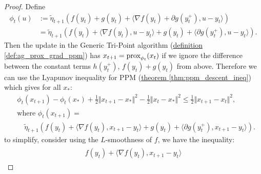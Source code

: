 \documentclass[12pt]{article}
\begin{document}
        \begin{proof}
            Define 
            \begin{align*}
                \phi_t(u) &:= 
                \tilde \eta_{t + 1} 
                \left(
                    f(y_t) + g(y_t) + \langle \nabla f(y_t) + \partial g(y_t^+), u - y_t\rangle
                \right)\\
                &= 
                \tilde \eta_{t + 1} \left(
                    f(y_t) + \langle \nabla f(y_t), u - y_t\rangle + 
                    g(y_t) + \langle \partial g(y_t^+), u - y_t\rangle
                \right). 
            \end{align*}
            Then the update in the Generic Tri-Point algorithm 
            (\hyperref[def:ag_prox_grad_ppm]
                {definition \ref*{def:ag_prox_grad_ppm}}) 
            has $x_{t + 1} = \operatorname{prox}_{\phi_t}(x_t)$ if we ignore the difference between the constant terms $h(y_t^+)$, $f(y_t) + g(y_t)$ from above. 
            Therefore we can use the Lyapunov inequality for PPM (\hyperref[thm:ppm_descent_ineq]
                {theorem \ref*{thm:ppm_descent_ineq}})
            which gives for all $x_*$: 
            \begin{align*}
                & \phi_t(x_{t + 1}) - \phi_t(x_*) + 
                \frac{1}{2}\Vert x_{t+1} - x_*\Vert^2 - 
                \frac{1}{2}\Vert x_t - x_*\Vert^2
                \le \frac{1}{2}\Vert x_{t + 1} - x_t\Vert^2, 
                \\
                & \text{where }
                \phi_t(x_{t + 1}) =
                \\
                & \quad 
                \tilde \eta_{t + 1}
                \left(
                    f(y_t) + \langle \nabla f(y_t), x_{t + 1} - y_t\rangle + 
                    g(y_t) + \langle \partial g(y_t^+), x_{t + 1} - y_t\rangle
                \right). 
            \end{align*}
            to simplify, consider using the $L$-smoothness of $f$, we have the inequality: 
            \begin{align*}
                \begin{aligned}
                    f(y_t) + \langle \nabla f(y_t), x_{t + 1} - y_t\rangle

\end{aligned}
\end{align*}
\end{proof}
\end{document}
